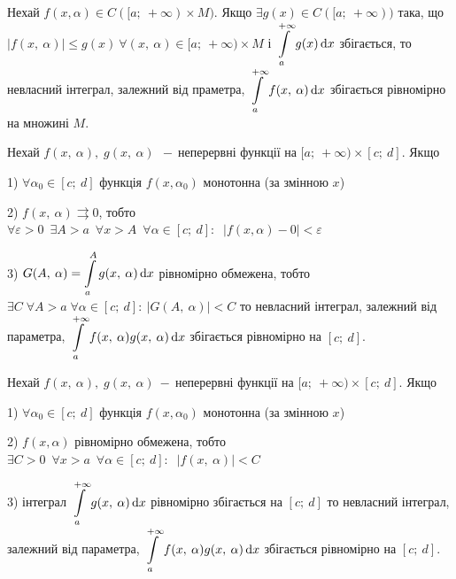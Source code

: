\begin{theorem} 
Нехай $f(x, \alpha) \in C([a; \: +\infty) \times M)$. Якщо $\exists g(x)\in C([a; \: +\infty))$ така, що $\left| f(x, \: \alpha)\right| \leqslant  g(x) \ \forall(x, \: \alpha) \in [a; \: +\infty) \times M$ і $\displaystyle\int\limits_a^{+\infty} g(x) \, \mathrm{d}x$  збігається, то невласний інтеграл, залежний від праметра, $\displaystyle\int\limits_a^{+\infty} f(x, \: \alpha) \, \mathrm{d}x$  збігається рівномірно на множині $M$.

\end{theorem} 

\begin{theorem} 
Нехай $f(x, \: \alpha), \; g(x, \: \alpha) \:  \: - \ $неперервні функції на $[a; \: +\infty) \times [c; \:d]$. Якщо  


1) $\forall\alpha_0 \in [c; \:d]$ функція $f(x, \alpha_0)$  монотонна (за змінною $x$)

2) $f(x, \: \alpha) \rightrightarrows 0$, тобто $\forall \varepsilon>0 \:\; \exists A>a \:\; \forall x> A \:\; \forall \alpha \in [c; \:d]:\;\; \left| f(x, \alpha)-0 \right| < \varepsilon$

3) $G(A, \: \alpha) = \displaystyle\int\limits_a^A g(x, \: \alpha) \, \mathrm{d}x$ рівномірно обмежена, тобто $\exists C \; \forall A > a \; \forall\alpha \in [c; \:d]: \: \left| G(A, \: \alpha) \right| < C$ \newline
то невласний інтеграл, залежний від параметра, $\displaystyle\int\limits_a^{+\infty} f(x, \: \alpha)  g(x, \: \alpha) \, \mathrm{d}x$ збігається рівномірно на $[c;\: d]$.



\end{theorem} 
\begin{theorem} 
Нехай $f(x, \: \alpha),\; g(x, \: \alpha) \: - \ $неперервні функції на $[a; \: +\infty) \times [c; \:d]$. Якщо  


1) $\forall\alpha_0 \in [c; \:d]$ функція $f(x, \alpha_0)$  монотонна (за змінною $x$)

2) $f(x, \alpha)$ рівномірно обмежена, тобто $\exists C>0 \:\; \forall x> a \:\; \forall \alpha \in [c; \:d]: \;\; \left| f(x, \: \alpha) \right| < C$


3) інтеграл $\displaystyle\int\limits_a^{+\infty} g(x, \: \alpha) \, \mathrm{d}x$ рівномірно збігається на $[c;\:d]$ \newline
то невласний інтеграл, залежний від параметра, $\displaystyle\int\limits_a^{+\infty} f(x, \: \alpha)  g(x, \: \alpha) \, \mathrm{d}x$ збігається рівномірно на $[c;\: d]$.
\end{theorem} 

